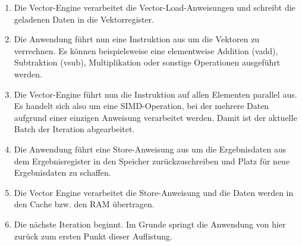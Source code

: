 \begin{enumerate}
    \item Die Vector-Engine verarbeitet die Vector-Load-Anweisungen und schreibt die geladenen Daten in die Vektorregister.


    \item Die Anwendung führt nun eine Instruktion aus um die Vektoren zu verrechnen. Es können beispielsweise eine elementweise Addition (vadd), Subtraktion (vsub), Multiplikation oder sonstige Operationen ausgeführt werden.


    \item Die Vector-Engine führt nun die Instruktion auf allen Elementen parallel aus. Es handelt sich also um eine \gls{SIMD}-Operation, bei der mehrere Daten aufgrund einer einzigen Anweisung verarbeitet werden. Damit ist der aktuelle Batch der Iteration abgearbeitet.


    \item Die Anwendung führt eine Store-Anweisung aus um die Ergebnisdaten aus dem Ergebnisregister in den Speicher zurückzuschreiben und Platz für neue Ergebnisdaten zu schaffen.


    \item Die Vector Engine verarbeitet die Store-Anweisung und die Daten werden in den Cache bzw. den RAM übertragen.


    \item Die nächste Iteration beginnt. Im Grunde springt die Anwendung von hier zurück zum ersten Punkt dieser Auflistung.

\end{enumerate}

